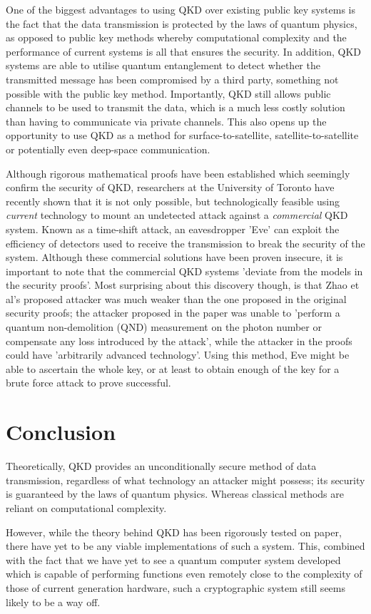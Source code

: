 \documentclass[runningheads,a4paper]{llncs}
\begin{document}
One of the biggest advantages to using QKD over existing public key systems is the fact that the data transmission is protected by the laws of quantum physics, as opposed to public key methods whereby computational complexity and the performance of current systems is all that ensures the security. In addition, QKD systems are able to utilise quantum entanglement  to detect whether the transmitted message has been compromised by a third party, something not possible with the public key method. Importantly, QKD still allows public channels to be used to transmit the data, which is a much less costly solution than having to communicate via private channels. This also opens up the opportunity to use QKD as a method for surface-to-satellite, satellite-to-satellite or potentially even deep-space communication.

Although rigorous mathematical proofs have been established which seemingly confirm the security of QKD\cite{Deutsch:1996fk}\cite{Shor:2000uq}, researchers at the University of Toronto have recently shown that it is not only possible, but technologically feasible using \emph{current} technology to mount an undetected attack against a \emph{commercial} QKD system. Known as a time-shift attack, an eavesdropper 'Eve' can exploit the efficiency of detectors used to receive the transmission to break the security of the system\cite{Zhao:2008fk}. Although these commercial solutions have been proven insecure, it is important to note that the commercial QKD systems 'deviate from the models in the security proofs'\cite{Lydersen:2010qy}. Most surprising about this discovery though, is that Zhao et al's proposed attacker was much weaker than the one proposed in the original security proofs; the attacker proposed in the paper was unable to 'perform a quantum non-demolition (QND) measurement on the photon number or compensate any loss introduced by the attack', while the attacker in the proofs could have 'arbitrarily advanced technology'. Using this method, Eve might be able to ascertain the whole key, or at least to obtain enough of the key for a brute force attack to prove successful. 

\section{Conclusion}

Theoretically, QKD provides an unconditionally secure method of data transmission, regardless of what technology an attacker might possess; its security is guaranteed by the laws of quantum physics. Whereas classical methods are reliant on computational complexity.

However, while the theory behind QKD has been rigorously tested on paper, there have yet to be any viable implementations of such a system. This, combined with the fact that we have yet to see a quantum computer system developed which is capable of performing functions even remotely close to the complexity of those of current generation hardware, such a cryptographic system still seems likely to be a way off.



\end{document}
